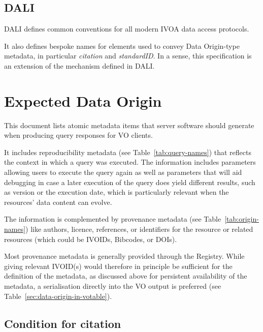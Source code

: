 \documentclass[11pt,a4paper]{ivoa}
\begin{document}
\subsection{DALI}
DALI \citep{2017ivoa.spec.0517D} defines common conventions for all
modern IVOA data access protocols.  

It also defines bespoke names for  elements used to convey
Data Origin-type metadata, in particular \emph{citation} and \emph{standardID}.  In a sense,
this specification is an extension of the mechanism defined in DALI.

\section{Expected Data Origin}
This document lists atomic metadata items that server software should
generate when producing query responses for VO clients.

It includes reproducibility metadata (see Table~\ref{tab:query-names})
that reflects the context in which a query was executed. The information
includes parameters allowing users to execute the query again as well as
parameters that will aid debugging in case a later execution of the
query does yield different results, such as version or the execution
date, which is particularly relevant when the resources' data content
can evolve.


The information is complemented by provenance metadata (see Table~\ref{tab:origin-names}) like authors, licence, references, or identifiers
for the resource or related resources (which could be IVOIDs, Bibcodes, or DOIs).

Most provenance metadata is generally provided through the Registry.
While giving relevant IVOID(s) would therefore in principle be
sufficient for the definition of the metadata, as discussed above for
persistent availability of the metadata, a serialisation
directly into the VO output is preferred
(see Table~\ref{sec:data-origin-in-votable}).



\subsection{Condition for citation}
\end{document}
